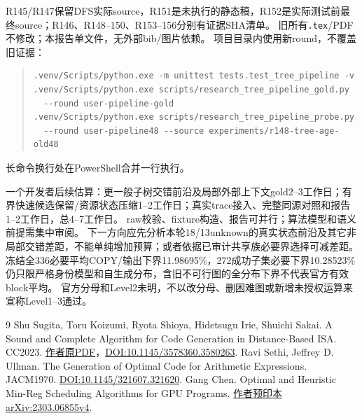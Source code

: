 \documentclass[UTF8,11pt,a4paper]{ctexart}
\begin{document}
R145/R147保留DFS实际source，R151是未执行的静态稿，R152是实际测试前最终source；R146、R148--150、R153--156分别有证据SHA清单。
旧所有\texttt{.tex}/PDF不修改；本报告单文件，无外部bib/图片依赖。
项目目录内使用新round，不覆盖旧证据：
\begin{quote}\small\begin{verbatim}
.venv/Scripts/python.exe -m unittest tests.test_tree_pipeline -v
.venv/Scripts/python.exe scripts/research_tree_pipeline_gold.py
  --round user-pipeline-gold
.venv/Scripts/python.exe scripts/research_tree_pipeline_probe.py
  --round user-pipeline48 --source experiments/r148-tree-age-old48
\end{verbatim}\end{quote}
长命令换行处在PowerShell合并一行执行。

一个开发者后续估算：更一般子树交错前沿及局部外部上下文gold2--3工作日；有界快速候选保留/资源状态压缩1--2工作日；真实trace接入、完整同源对照和报告1--2工作日，总4--7工作日。
raw校验、fixture构造、报告可并行；算法模型和语义前提需集中审阅。
下一方向应先分析本轮18/13unknown的真实状态前沿及其它非局部交错差距，不能单纯增加预算；或者依据已审计共享族必要界选择可减差距。
冻结全336必要平均COPY/输出下界11.98695\%，272成功子集必要下界10.28523\%仍只限严格身份模型和自生成分布，含旧不可行图的全分布下界不代表官方有效block平均。
官方分母和Level2未明，不以改分母、删困难图或新增未授权运算来宣称Level1--3通过。

\begin{thebibliography}{9}
 Shu Sugita, Toru Koizumi, Ryota Shioya, Hidetsugu Irie, Shuichi Sakai.
A Sound and Complete Algorithm for Code Generation in Distance-Based ISA. CC2023.
\href{https://www.rsg.ci.i.u-tokyo.ac.jp/lab/en/assets/files/cc2023-sugita.pdf}{作者原PDF}，\href{https://doi.org/10.1145/3578360.3580263}{DOI:10.1145/3578360.3580263}.
 Ravi Sethi, Jeffrey D. Ullman. The Generation of Optimal Code for Arithmetic Expressions. JACM1970.
\href{https://doi.org/10.1145/321607.321620}{DOI:10.1145/321607.321620}.
 Gang Chen. Optimal and Heuristic Min-Reg Scheduling Algorithms for GPU Programs.
\href{https://arxiv.org/abs/2303.06855v4}{作者预印本arXiv:2303.06855v4}.
\end{thebibliography}
\end{document}
